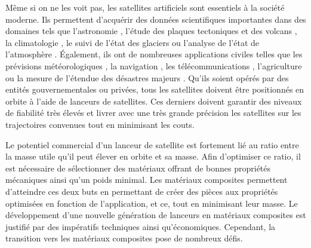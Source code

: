 \label{sec:Introduction}  %

Même si on ne les voit pas, les satellites artificiels sont essentiels à la société moderne. 
Ils permettent d'acquérir des données scientifiques importantes dans des domaines tels que l'astronomie \cite{Freedman2001}, l'étude des plaques tectoniques et des volcans \cite{Christodoulidis1985}, la climatologie \cite{Hollmann2013}, le suivi de l'état des glaciers \cite{Goldstein1993} ou l'analyse de l'état de l'atmosphère \cite{Laube2014}. 
Également, ils ont de nombreuses applications civiles telles que les prévisions météorologiques \cite{Bauer2015}, la navigation \cite{Getting1993}, les télécommunications \cite{Evans2005}, l'agriculture \cite{Lobell2002} ou la mesure de l'étendue des désastres majeurs \cite{Tralli2005}.  
Qu'ils soient opérés par des entités gouvernementales ou privées, tous les satellites doivent être positionnés en orbite à l'aide de lanceurs de satellites. 
Ces derniers doivent garantir des niveaux de fiabilité très élevés et livrer avec une très grande précision les satellites sur les trajectoires convenues tout en minimisant les couts. 

Le potentiel commercial d'un lanceur de satellite est fortement lié au ratio entre la masse utile qu'il peut élever en orbite et sa masse. 
Afin d'optimiser ce ratio, il est nécessaire de sélectionner des matériaux offrant de bonnes propriétés mécaniques ainsi qu'un poids minimal. 
Les matériaux composites permettent d'atteindre ces deux buts en permettant de créer des pièces aux propriétés optimisées en fonction de l'application, et ce, tout en minimisant leur masse. 
Le développement d'une nouvelle génération de lanceurs en matériaux composites est justifié par des impératifs techniques ainsi qu'économiques. 
Cependant, la transition vers les matériaux composites pose de nombreux défis. 

